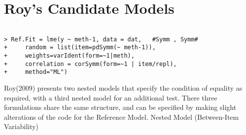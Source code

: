 

\section{Roy's Candidate Models}



\begin{framed}
\begin{verbatim}

> Ref.Fit = lme(y ~ meth-1, data = dat,   #Symm , Symm#
+     random = list(item=pdSymm(~ meth-1)), 
+     weights=varIdent(form=~1|meth),
+     correlation = corSymm(form=~1 | item/repl), 
+     method="ML")
\end{verbatim}
\end{framed}
Roy(2009) presents two nested models that specify the condition of equality as required, with a third nested model for an additional test. There three formulations share the same structure, and can be specified by making slight alterations of the code for the Reference Model.
Nested Model (Between-Item Variability)



